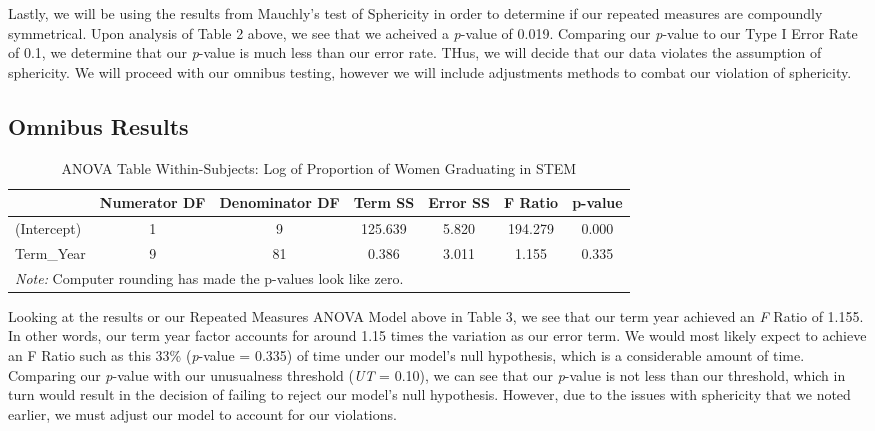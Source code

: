 \documentclass[]{article}
\begin{document}
Lastly, we will be using the results from Mauchly's test of Sphericity
in order to determine if our repeated measures are compoundly
symmetrical. Upon analysis of Table 2 above, we see that we acheived a
\emph{p}-value of 0.019. Comparing our \emph{p}-value to our Type I
Error Rate of 0.1, we determine that our \emph{p}-value is much less
than our error rate. THus, we will decide that our data violates the
assumption of sphericity. We will proceed with our omnibus testing,
however we will include adjustments methods to combat our violation of
sphericity.

\subsection{Omnibus Results}\label{omnibus-results}

\begin{table}[H]

\caption{\label{tab:univariate Results}ANOVA Table Within-Subjects: Log of Proportion of Women Graduating in STEM}
\centering
\fontsize{12}{14}\selectfont
\begin{tabular}[t]{l|c|c|c|c|c|c}
\hline
  & Numerator DF & Denominator DF & Term SS & Error SS & F Ratio & p-value\\
\hline
(Intercept) & 1 & 9 & 125.639 & 5.820 & 194.279 & 0.000\\
\hline
Term\_Year & 9 & 81 & 0.386 & 3.011 & 1.155 & 0.335\\
\hline
\multicolumn{7}{l}{\textit{Note: } Computer rounding has made the p-values look like zero.}\\
\end{tabular}
\end{table}

Looking at the results or our Repeated Measures ANOVA Model above in
Table 3, we see that our term year achieved an \emph{F} Ratio of 1.155.
In other words, our term year factor accounts for around 1.15 times the
variation as our error term. We would most likely expect to achieve an F
Ratio such as this 33\% (\emph{p}-value = 0.335) of time under our
model's null hypothesis, which is a considerable amount of time.
Comparing our \emph{p}-value with our unusualness threshold (\emph{UT} =
0.10), we can see that our \emph{p}-value is not less than our
threshold, which in turn would result in the decision of failing to
reject our model's null hypothesis. However, due to the issues with
sphericity that we noted earlier, we must adjust our model to account
for our violations.
\end{document}
